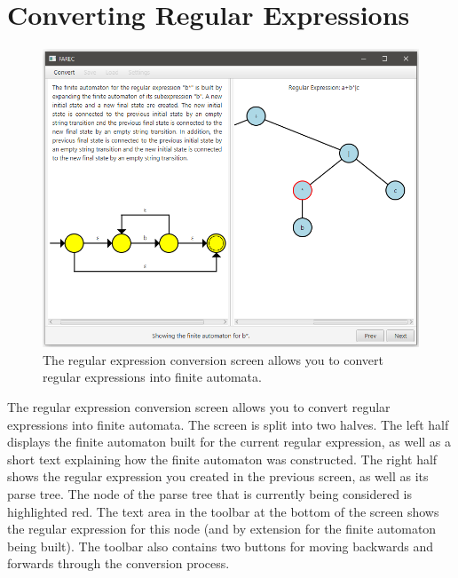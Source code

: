 \documentclass[12pt]{report}
\begin{document}
\section{Converting Regular Expressions} \label{ConvertingRegularExpressions}

\begin{figure}[htbp]
    \centering
    \includegraphics[width=\textwidth]{./Diagrams/ConvertREScreen.png}
    \caption{The regular expression conversion screen allows you to convert
    regular expressions into finite automata.}
    \label{ConvertREScreen}
\end{figure}

The regular expression conversion screen allows you to convert regular
expressions into finite automata. The screen is split into two halves. The left
half displays the finite automaton built for the current regular expression, as
well as a short text explaining how the finite automaton was constructed. The
right half shows the regular expression you created in the previous screen, as
well as its parse tree. The node of the parse tree that is currently being
considered is highlighted red. The text area in the toolbar at the bottom of the
screen shows the regular expression for this node (and by extension for the
finite automaton being built). The toolbar also contains two buttons for moving
backwards and forwards through the conversion process.
\end{document}
